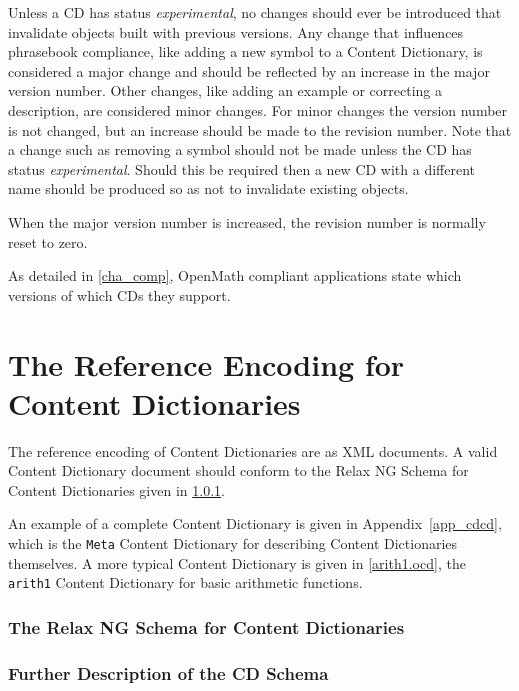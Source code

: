 \documentclass{report}
\def\OM{OpenMath\xspace}
\def\XML{XML\xspace}
\begin{document}
      
Unless a CD has status \emph{experimental}, no changes should ever be introduced that
invalidate objects built with previous versions.  Any change that influences phrasebook
compliance, like adding a new symbol to a Content Dictionary, is considered a major change
and should be reflected by an increase in the major version number. Other changes, like
adding an example or correcting a description, are considered minor changes. For minor
changes the version number is not changed, but an increase should be made to the revision
number.  Note that a change such as removing a symbol should not be made unless the CD has
status \emph{experimental}.  Should this be required then a new CD with a different name
should be produced so as not to invalidate existing objects.
      
When the major version number is increased, the revision number is normally reset to zero.

      
As detailed in \ref{cha_comp}, \OM compliant applications state which versions of which
CDs they support.
  
\section{The Reference Encoding for Content Dictionaries}\label{sec_xml_cd}
    
The reference encoding of Content Dictionaries are as \XML documents.  A valid Content
Dictionary document should conform to the Relax NG Schema for Content Dictionaries given
in \ref{sec_cd_schema}.
    
An example of a complete Content Dictionary is given in Appendix~\ref{app_cdcd}, which is
the \lstinline|Meta| Content Dictionary for describing Content Dictionaries themselves. A
more typical Content Dictionary is given in \ref{arith1.ocd}, the \lstinline|arith1|
Content Dictionary for basic arithmetic functions.

    
\subsubsection{The Relax NG Schema for Content Dictionaries}\label{sec_cd_schema}



\subsubsection{Further Description of the CD Schema}\label{sect_pcdata}
\end{document}
